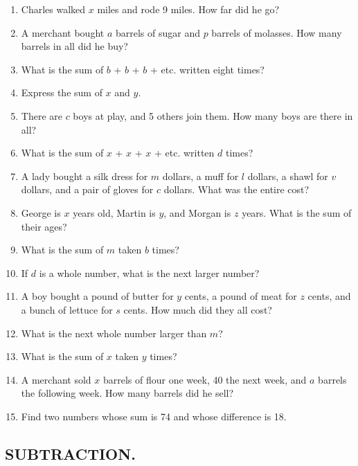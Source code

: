 \documentclass{book}
\begin{document}
\begin{enumerate}
\item Charles walked $x$ miles and rode 9 miles. How far did he
go?

\item A merchant bought $a$ barrels of sugar and $p$ barrels of
molasses. How many barrels in all did he buy?

\item What is the sum of $b$ + $b$ + $b$ + etc. written eight
times?

\item Express the sum of $x$ and $y$.

\item There are $c$ boys at play, and 5 others join them. How many
boys are there in all?

\item What is the sum of $x$ + $x$ + $x$ + etc. written $d$ times?

\item A lady bought a silk dress for $m$ dollars, a muff for $l$
dollars, a shawl for $v$ dollars, and a pair of gloves for $c$
dollars. What was the entire cost?

\item George is $x$ years old, Martin is $y$, and Morgan is $z$
years. What is the sum of their ages?

\item What is the sum of $m$ taken $b$ times?

\item If $d$ is a whole number, what is the next larger number?

\item A boy bought a pound of butter for $y$ cents, a pound of
meat for $z$ cents, and a bunch of lettuce for $s$ cents. How much
did they all cost?

\item What is the next whole number larger than $m$?

\item What is the sum of $x$ taken $y$ times?

\item A merchant sold $x$ barrels of flour one week, 40 the next
week, and $a$ barrels the following week. How many barrels did he
sell?

\item Find two numbers whose sum is 74 and whose difference is 18.
\end{enumerate}

\subsection*{SUBTRACTION.}
\end{document}
